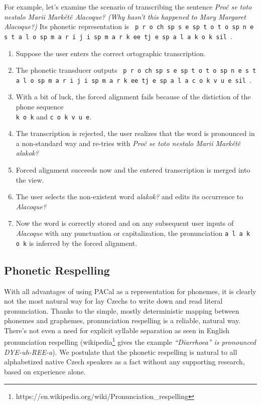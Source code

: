 \documentclass{itatnew}
\begin{document}
For example, let's examine the scenario of transcribing the sentence {\em Proč
se toto nestalo Marii Markétě Alacoque? (Why hasn't this happened to Mary
Margaret Alacoque?)} Its phonetic representation is \texttt{
    p r o ch sp
    s e sp
    t o t o sp
    n e s t a l o sp
    m a r i j i sp
    m a r k ee tj e sp
    a l a k o k sil
}.
\begin{enumerate}
\item{Suppose the user enters the correct ortographic transcription.}
\item{
    The phonetic transducer outputs \texttt{
        p r o ch sp
        s e sp
        t o t o sp
        n e s t a l o sp
        m a r i j i sp
        m a r k ee tj e sp
        a l a c o k v u e sil
    }.
}
\item{
    With a bit of luck, the forced alignment fails because of the distiction of
    the phone sequence\\ \texttt{k o k} and \texttt{c o k v u e}.
}
\item{
    The transcription is rejected, the user realizes that the word is pronounced
    in a non-standard way and re-tries with
    {\em Proč se toto nestalo Marii Markétě alakok?}
}
\item{
    Forced alignment succeeds now and the entered transcription is merged into
    the view.
}
\item{
    The user selects the non-existent word {\em alakok?} and edits its occurrence
    to {\em Alacoque?}
}
\item{
    Now the word is correctly stored and on any subsequent user inputs of {\em
    Alacoque} with any punctuation or capitalization, the pronunciation
    \texttt{a l a k o k} is inferred by the forced alignment.
}
\end{enumerate}

\subsection{Phonetic Respelling}
\label{subsec:respelling}

With all advantages of using PACal as a representation for phonemes, it is
clearly not the most natural way for lay Czechs to write down and read literal
pronunciation. Thanks to the simple, mostly
deterministic mapping between phonemes and graphemes, pronunciation respelling
is a reliable, natural way. There's not even a need for explicit syllable
separation as seen in English pronunciation respelling
(wikipedia\footnote{https://en.wikipedia.org/wiki/Pronunciation\_respelling}
gives the example {\em ``Diarrhoea'' is pronounced DYE-uh-REE-a}).
We postulate that the phonetic respelling is natural to all alphabetized native
Czech speakers as a fact without any supporting research, based on experience
alone. 
\end{document}
